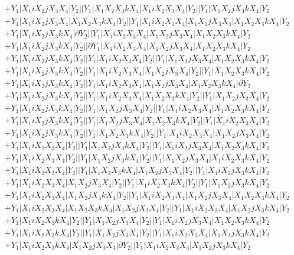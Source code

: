 \documentclass{article}[12pt]
\begin{document}
\begin{align*}
 & +Y_1|X_1iX_2jX_3X_4|Y_2||Y_1|X_1X_2X_3kX_4|X_1iX_2X_3X_4|Y_2||Y_1|X_1X_2jX_3kX_4|Y_2\\ 
 & +Y_1|X_1iX_2jX_3X_4|X_1X_2X_3kX_4|Y_2||Y_1|X_1iX_2X_3X_4|X_1X_2jX_3X_4|X_1X_2X_3kX_4|Y_2\\ 
 & +Y_1|X_1iX_2jX_3kX_4|\partial Y_2||Y_1|X_1iX_2X_3X_4|X_1X_2jX_3X_4|X_1X_2X_3kX_4|Y_2\\ 
 & +Y_1|X_1iX_2jX_3kX_4|Y_2||\partial Y_1|X_1iX_2X_3X_4|X_1X_2jX_3X_4|X_1X_2X_3kX_4|Y_2\\ 
 & +Y_1|X_1iX_2jX_3kX_4|Y_2||Y_1|X_1iX_2X_3X_4|Y_2||Y_1|X_1X_2jX_3X_4|X_1X_2X_3kX_4|Y_2\\ 
 & +Y_1|X_1iX_2jX_3kX_4|Y_2||Y_1|X_1iX_2X_3X_4|X_1X_2jX_3X_4|Y_2||Y_1|X_1X_2X_3kX_4|Y_2\\ 
 & +Y_1|X_1iX_2jX_3kX_4|Y_2||Y_1|X_1iX_2X_3X_4|X_1X_2jX_3X_4|X_1X_2X_3kX_4|\partial Y_2\\ 
 & +Y_1|X_1iX_2jX_3kX_4|Y_2||Y_1|X_1iX_2X_3X_4|X_1X_2X_3kX_4|Y_2||Y_1|X_1X_2jX_3X_4|Y_2\\ 
 & +Y_1|X_1iX_2jX_3kX_4|Y_2||Y_1|X_1X_2jX_3X_4|Y_2||Y_1|X_1iX_2X_3X_4|X_1X_2X_3kX_4|Y_2\\ 
 & +Y_1|X_1iX_2jX_3kX_4|Y_2||Y_1|X_1X_2jX_3X_4|X_1X_2X_3kX_4|Y_2||Y_1|X_1iX_2X_3X_4|Y_2\\ 
 & +Y_1|X_1iX_2jX_3kX_4|Y_2||Y_1|X_1X_2X_3kX_4|Y_2||Y_1|X_1iX_2X_3X_4|X_1X_2jX_3X_4|Y_2\\ 
 & +Y_1|X_1iX_2X_3X_4|Y_2||Y_1|X_1X_2jX_3kX_4|Y_2||Y_1|X_1iX_2jX_3X_4|X_1X_2X_3kX_4|Y_2\\ 
 & +Y_1|X_1iX_2X_3X_4|Y_2||Y_1|X_1X_2jX_3kX_4|Y_2||Y_1|X_1X_2jX_3X_4|X_1iX_2X_3kX_4|Y_2\\ 
 & +Y_1|X_1iX_2X_3X_4|Y_2||Y_1|X_1X_2X_3kX_4|X_1X_2jX_3X_4|Y_2||Y_1|X_1iX_2jX_3kX_4|Y_2\\ 
 & +Y_1|X_1iX_2X_3X_4|X_1X_2jX_3X_4|Y_2||Y_1|X_1iX_2X_3kX_4|Y_2||Y_1|X_1X_2jX_3kX_4|Y_2\\ 
 & +Y_1|X_1iX_2X_3X_4|X_1X_2jX_3kX_4|Y_2||Y_1|X_1iX_2X_3X_4|X_1X_2jX_3X_4|X_1X_2X_3kX_4|Y_2\\ 
 & +Y_1|X_1iX_2X_3X_4|X_1X_2X_3kX_4|X_1X_2jX_3X_4|Y_2||Y_1|X_1iX_2X_3X_4|X_1X_2jX_3kX_4|Y_2\\ 
 & +Y_1|X_1iX_2X_3kX_4|Y_2||Y_1|X_1X_2jX_3X_4|Y_2||Y_1|X_1iX_2jX_3X_4|X_1X_2X_3kX_4|Y_2\\ 
 & +Y_1|X_1iX_2X_3kX_4|Y_2||Y_1|X_1X_2jX_3X_4|Y_2||Y_1|X_1iX_2X_3X_4|X_1X_2jX_3kX_4|Y_2\\ 
 & +Y_1|X_1iX_2X_3kX_4|X_1X_2jX_3X_4|\partial Y_2||Y_1|X_1iX_2X_3X_4|X_1X_2jX_3kX_4|Y_2\\ 

\end{align*}
\end{document}
